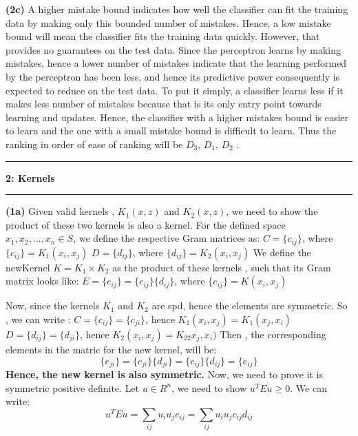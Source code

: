 \documentclass{article}
\newcommand\question[2]{\vspace{.25in}\hrule\textbf{#1: #2}\hrule\vspace{.10in}}
\renewcommand\part[1]{\vspace{.10in}\textbf{(#1)}}
\begin{document}
    \part{2c} A higher mistake bound indicates how well the classifier can fit the training data by making only this bounded number of mistakes. Hence, a low mistake bound will mean the classifier fits the training data quickly. However, that provides no guarantees on the test data. Since the perceptron learns by making mistakes, hence a lower number of mistakes indicate that the learning performed by the perceptron has been less, and hence its predictive power consequently is expected to reduce on the test data. To put it simply, a classifier learns less if it makes less number of mistakes because that is its only entry point towards learning and updates. Hence, the classifier with a higher mistakes bound is easier to learn and the one with a small mistake bound is difficult to learn. Thus the ranking in order of ease of ranking will be $D_3$, $D_1$, $D_2$ . \newline

    \question{2}{Kernels}
    \part{1a} Given valid kernels , $K_1(x,z)$ and $K_2(x,z)$, we need to show the product of these two kernels is also a kernel. For the defined space $x_1, x_2, \dots, x_n \in S$, we define the respective Gram matrices as: \newline
    $ C = \{c_{ij}\}$, where $\{c_{ij}\} = K_1(x_i, x_j) $ \newline
    $ D = \{d_{ij}\}$, where $\{d_{ij}\} = K_2(x_i, x_j) $ \newline
    We define the newKernel $K=K_1 \times K_2$ as the product of these kernels , such that its Gram matrix looks like: \newline
    $ E = \{e_{ij}\} = \{c_{ij}\}\{d_{ij}\}$, where $\{e_{ij}\}  = K(x_i, x_j) $ \newline

    Now, since the kernels $K_1$ and $K_2$ are spd, hence the elements are symmetric. So , we can write : \newline
    $ C = \{c_{ij}\} = \{c_{ji}\}$, hence $ K_1(x_i, x_j) = K_1(x_j, x_i) $
    $ D = \{d_{ij}\} = \{d_{ji}\}$, hence $ K_2(x_i, x_j) = K_22x_j, x_i) $
    Then , the corresponding elements in the matric for the new kernel, will be:
    \[ \{e_{ji}\} = \{c_{ji}\}\{d_{ji}\} = \{c_{ij}\}\{d_{ij}\} = \{e_{ij}\}  \]
    \textbf {Hence, the new kernel is also symmetric. }
    Now, we need to prove it is symmetric positive definite. Let $u \in R^n$, we need to show $u^TEu \geq 0$. We can write:\newline
    \begin{equation}
    u^TEu = \sum_{ij} u_i u_j e_{ij} = \sum_{ij} u_i u_j c_{ij} d_{ij}
    \end{equation}
\end{document}
